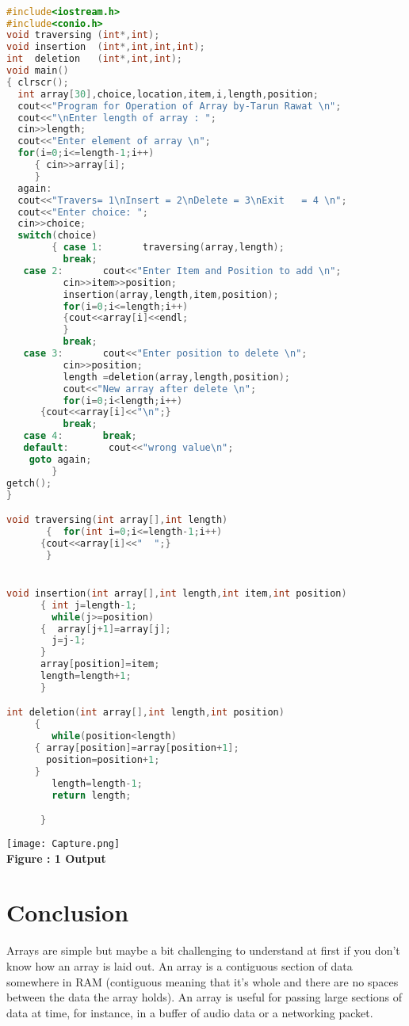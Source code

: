 \documentclass[11pt]{article}            %
\begin{document}
\begin{lstlisting}[language=c++]

#include<iostream.h>
#include<conio.h>
void traversing (int*,int);
void insertion  (int*,int,int,int);
int  deletion   (int*,int,int);
void main()
{ clrscr();
  int array[30],choice,location,item,i,length,position;
  cout<<"Program for Operation of Array by-Tarun Rawat \n";
  cout<<"\nEnter length of array : ";
  cin>>length;
  cout<<"Enter element of array \n";
  for(i=0;i<=length-1;i++)
     { cin>>array[i];
     }
  again:
  cout<<"Travers= 1\nInsert = 2\nDelete = 3\nExit   = 4 \n";
  cout<<"Enter choice: ";
  cin>>choice;
  switch(choice)
        { case 1:       traversing(array,length);
          break;
   case 2:       cout<<"Enter Item and Position to add \n";
          cin>>item>>position;
          insertion(array,length,item,position);
          for(i=0;i<=length;i++)
          {cout<<array[i]<<endl;
          }
          break;
   case 3:       cout<<"Enter position to delete \n";
          cin>>position;
          length =deletion(array,length,position);
          cout<<"New array after delete \n";
          for(i=0;i<length;i++)
      {cout<<array[i]<<"\n";}
          break;
   case 4:       break;
   default:       cout<<"wrong value\n";
    goto again;
        }
getch();
}

void traversing(int array[],int length)
       {  for(int i=0;i<=length-1;i++)
      {cout<<array[i]<<"  ";}
       }


void insertion(int array[],int length,int item,int position)
      { int j=length-1;
        while(j>=position)
      {  array[j+1]=array[j];
        j=j-1;
      }
      array[position]=item;
      length=length+1;
      }

int deletion(int array[],int length,int position)
     {
        while(position<length)
     { array[position]=array[position+1];
       position=position+1;
     }
        length=length-1;
        return length;

      }

\end{lstlisting}

\begin{center}
 \texttt{[image: Capture.png]}\\ 
\textbf{Figure : 1 Output}
\vskip 0.5cm
\end{center}

\section{Conclusion}  
Arrays are simple but maybe a bit challenging to understand at first if you don't know how an array is laid out. An array is a contiguous section of data somewhere in RAM (contiguous meaning that it's whole and there are no spaces between the data the array holds). An array is useful for passing large sections of data at time, for instance, in a buffer of audio data or a networking packet. 

 
\end{document}
